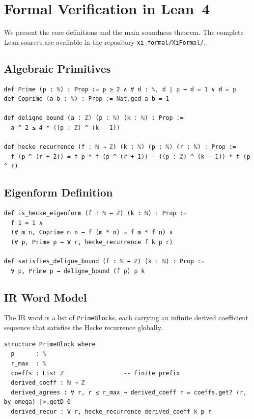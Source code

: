 \documentclass[11pt,a4paper]{article}
\begin{document}
\section{Formal Verification in Lean~4}
We present the core definitions and the main soundness theorem. The complete Lean sources are available in the repository \texttt{xi\_formal/XiFormal/}.

\subsection{Algebraic Primitives}
\begin{lstlisting}[language=lean, caption={Basic predicates.}]
def Prime (p : ℕ) : Prop := p ≥ 2 ∧ ∀ d : ℕ, d ∣ p → d = 1 ∨ d = p
def Coprime (a b : ℕ) : Prop := Nat.gcd a b = 1

def deligne_bound (a : ℤ) (p : ℕ) (k : ℕ) : Prop :=
  a ^ 2 ≤ 4 * ((p : ℤ) ^ (k - 1))

def hecke_recurrence (f : ℕ → ℤ) (k : ℕ) (p : ℕ) (r : ℕ) : Prop :=
  f (p ^ (r + 2)) = f p * f (p ^ (r + 1)) - ((p : ℤ) ^ (k - 1)) * f (p ^ r)
\end{lstlisting}

\subsection{Eigenform Definition}
\begin{lstlisting}[language=lean, caption={Hecke eigenform.}]
def is_hecke_eigenform (f : ℕ → ℤ) (k : ℕ) : Prop :=
  f 1 = 1 ∧
  (∀ m n, Coprime m n → f (m * n) = f m * f n) ∧
  (∀ p, Prime p → ∀ r, hecke_recurrence f k p r)

def satisfies_deligne_bound (f : ℕ → ℤ) (k : ℕ) : Prop :=
  ∀ p, Prime p → deligne_bound (f p) p k
\end{lstlisting}

\subsection{IR Word Model}
The IR word is a list of \texttt{PrimeBlock}s, each carrying an infinite derived coefficient sequence that satisfies the Hecke recurrence globally.

\begin{lstlisting}[language=lean, caption={PrimeBlock and derived coefficients.}]
structure PrimeBlock where
  p      : ℕ
  r_max  : ℕ
  coeffs : List ℤ                 -- finite prefix
  derived_coeff : ℕ → ℤ
  derived_agrees : ∀ r, r ≤ r_max → derived_coeff r = coeffs.get? ⟨r, by omega⟩ |>.getD 0
  derived_recur : ∀ r, hecke_recurrence derived_coeff k p r
\end{lstlisting}
\end{document}
